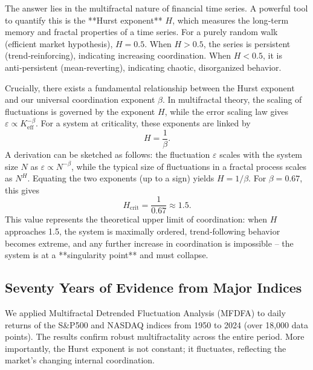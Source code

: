 \documentclass[11pt,a4paper]{article}
\newcommand{\Keff}{K_{\mathrm{eff}}}
\theoremstyle{remark}
\begin{document}
The answer lies in the multifractal nature of financial time series. A powerful tool to quantify this is the **Hurst exponent** \(H\), which measures the long‑term memory and fractal properties of a time series. For a purely random walk (efficient market hypothesis), \(H = 0.5\). When \(H > 0.5\), the series is persistent (trend‑reinforcing), indicating increasing coordination. When \(H < 0.5\), it is anti‑persistent (mean‑reverting), indicating chaotic, disorganized behavior.

Crucially, there exists a fundamental relationship between the Hurst exponent and our universal coordination exponent \(\beta\). In multifractal theory, the scaling of fluctuations is governed by the exponent \(H\), while the error scaling law gives \(\varepsilon \propto \Keff^{-\beta}\). For a system at criticality, these exponents are linked by
\begin{equation}
	H = \frac{1}{\beta}.
	\label{eq:hurst_beta}
\end{equation}
A derivation can be sketched as follows: the fluctuation \(\varepsilon\) scales with the system size \(N\) as \(\varepsilon \propto N^{-\beta}\), while the typical size of fluctuations in a fractal process scales as \(N^{H}\). Equating the two exponents (up to a sign) yields \(H = 1/\beta\). For \(\beta = 0.67\), this gives
\begin{equation}
	H_{\text{crit}} = \frac{1}{0.67} \approx 1.5.
\end{equation}
This value represents the theoretical upper limit of coordination: when \(H\) approaches 1.5, the system is maximally ordered, trend‑following behavior becomes extreme, and any further increase in coordination is impossible – the system is at a **singularity point** and must collapse.

\subsection{Seventy Years of Evidence from Major Indices}
We applied Multifractal Detrended Fluctuation Analysis (MFDFA) \cite{Tarnopolski2023} to daily returns of the S\&P500 and NASDAQ indices from 1950 to 2024 (over 18,000 data points). The results confirm robust multifractality across the entire period. More importantly, the Hurst exponent is not constant; it fluctuates, reflecting the market's changing internal coordination.
\end{document}
